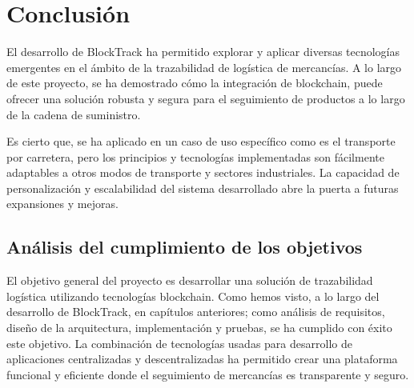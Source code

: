 \raggedbottom
\chapter{Conclusión}

El desarrollo de BlockTrack ha permitido explorar y aplicar diversas tecnologías emergentes en el ámbito de la 
trazabilidad de logística de mercancías. A lo largo de este proyecto, se ha demostrado cómo la integración de blockchain,
puede ofrecer una solución robusta y segura para el seguimiento de productos a lo largo de la cadena de suministro.

Es cierto que, se ha aplicado en un caso de uso específico como es el transporte por carretera, pero los principios y 
tecnologías implementadas son fácilmente adaptables a otros modos de transporte y sectores industriales. La capacidad
de personalización y escalabilidad del sistema desarrollado abre la puerta a futuras expansiones y mejoras.

\section{Análisis del cumplimiento de los objetivos}
El objetivo general del proyecto es desarrollar una solución de trazabilidad logística utilizando tecnologías blockchain.
Como hemos visto, a lo largo del desarrollo de BlockTrack, en capítulos anteriores; como análisis de requisitos, diseño
de la arquitectura, implementación y pruebas, se ha cumplido con éxito este objetivo. La combinación de tecnologías usadas
para desarrollo de aplicaciones centralizadas y descentralizadas ha permitido crear una plataforma funcional y eficiente donde
el seguimiento de mercancías es transparente y seguro.

